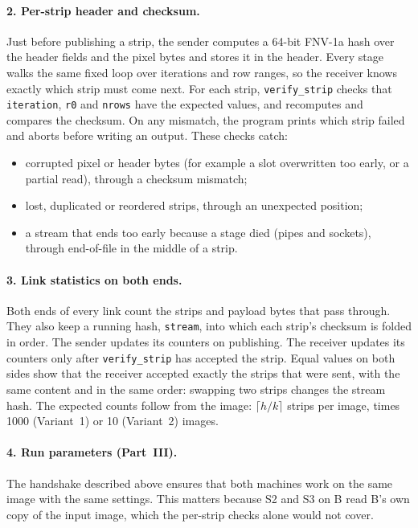 \documentclass[11pt,a4paper]{article}
\newcommand{\cfgIterations}{1000}
\newcommand{\cfgResults}{10}
\newcommand{\code}[1]{\texttt{#1}}
\begin{document}
\paragraph{2. Per-strip header and checksum.} Just before publishing a strip, the sender
computes a 64-bit FNV-1a hash over the header fields and the pixel bytes and stores it in the
header. Every stage walks the same fixed loop over iterations and row ranges, so the receiver
knows exactly which strip must come next. For each strip, \code{verify\_strip} checks that
\code{iteration}, \code{r0} and \code{nrows} have the expected values, and recomputes and compares
the checksum. On any mismatch, the program prints which strip failed and aborts before writing
an output. These checks catch:
\begin{itemize}
\item corrupted pixel or header bytes (for example a slot overwritten too early, or a partial
  read), through a checksum mismatch;
\item lost, duplicated or reordered strips, through an unexpected position;
\item a stream that ends too early because a stage died (pipes and sockets), through
  end-of-file in the middle of a strip.
\end{itemize}

\paragraph{3. Link statistics on both ends.} Both ends of every link count the strips and
payload bytes that pass through. They also keep a running hash, \code{stream}, into which each
strip's checksum is folded in order. The sender updates its counters on publishing. The
receiver updates its counters only after \code{verify\_strip} has accepted the strip. Equal
values on both sides show that the receiver accepted exactly the strips that were sent, with the
same content and in the same order: swapping two strips changes the stream hash. The expected
counts follow from the image: $\lceil h/k\rceil$ strips per image, times \cfgIterations{}
(Variant~1) or \cfgResults{} (Variant~2) images.

\paragraph{4. Run parameters (Part~III).} The handshake described above ensures that both
machines work on the same image with the same settings. This matters because S2 and S3 on B
read B's own copy of the input image, which the per-strip checks alone would not cover.
\end{document}
